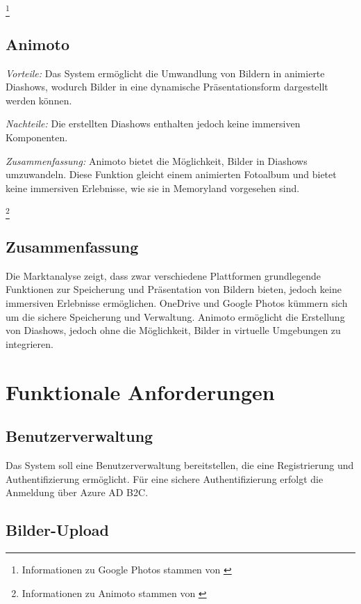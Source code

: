 \footnote{Informationen zu Google Photos stammen von \cite{GoogleIrelandLimited}}

\subsection{Animoto}

\emph{Vorteile:}
Das System ermöglicht die Umwandlung von Bildern in animierte Diashows,
wodurch Bilder in eine dynamische Präsentationsform dargestellt werden
können.

\emph{Nachteile:}
Die erstellten Diashows enthalten jedoch keine immersiven Komponenten.

\emph{Zusammenfassung:}
Animoto bietet die Möglichkeit, Bilder in Diashows umzuwandeln. Diese Funktion gleicht 
einem animierten Fotoalbum und bietet keine immersiven Erlebnisse, wie sie in Memoryland
vorgesehen sind.

\footnote{Informationen zu Animoto stammen von \cite{Animoto}}

\subsection{Zusammenfassung}

Die Marktanalyse zeigt, dass zwar verschiedene Plattformen grundlegende 
Funktionen zur Speicherung und Präsentation von Bildern bieten, jedoch 
keine immersiven Erlebnisse ermöglichen. OneDrive und Google Photos kümmern 
sich um die sichere Speicherung und Verwaltung. Animoto ermöglicht die 
Erstellung von Diashows, jedoch ohne die Möglichkeit, Bilder in virtuelle 
Umgebungen zu integrieren.

\section{Funktionale Anforderungen}

\subsection{Benutzerverwaltung}

Das System soll eine Benutzerverwaltung bereitstellen, die eine Registrierung 
und Authentifizierung ermöglicht. Für eine sichere Authentifizierung erfolgt
die Anmeldung über Azure AD B2C.

\subsection{Bilder-Upload}

